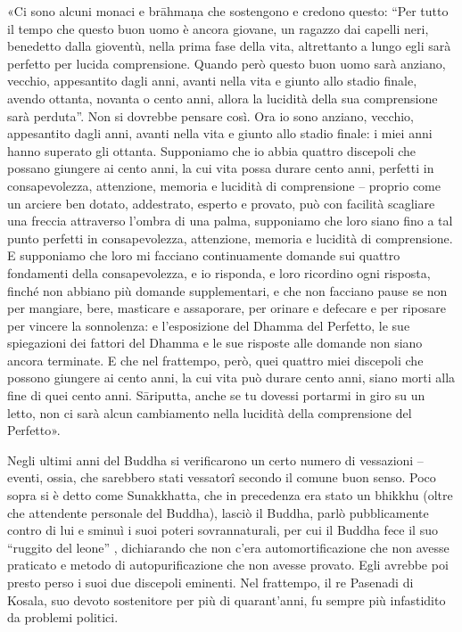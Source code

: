 «Ci sono alcuni monaci e brāhmaṇa che sostengono e credono questo: “Per tutto il
tempo che questo buon uomo è ancora giovane, un ragazzo dai capelli neri,
benedetto dalla gioventù, nella prima fase della vita, altrettanto a lungo egli
sarà perfetto per lucida comprensione. Quando però questo buon uomo sarà
anziano, vecchio, appesantito dagli anni, avanti nella vita e giunto allo stadio
finale, avendo ottanta, novanta o cento anni, allora la lucidità della sua
comprensione sarà perduta”. Non si dovrebbe pensare così. Ora io sono anziano,
vecchio, appesantito dagli anni, avanti nella vita e giunto allo stadio finale:
i miei anni hanno superato gli ottanta. Supponiamo che io abbia quattro
discepoli che possano giungere ai cento anni, la cui vita possa durare cento
anni, perfetti in consapevolezza, attenzione, memoria e lucidità di comprensione
– proprio come un arciere ben dotato, addestrato, esperto e provato, può con
facilità scagliare una freccia attraverso l’ombra di una palma, supponiamo che
loro siano fino a tal punto perfetti in consapevolezza, attenzione, memoria e
lucidità di comprensione. E supponiamo che loro mi facciano continuamente
domande sui quattro fondamenti della consapevolezza, e io risponda, e loro
ricordino ogni risposta, finché non abbiano più domande supplementari, e che non
facciano pause se non per mangiare, bere, masticare e assaporare, per orinare e
defecare e per riposare per vincere la sonnolenza: e l’esposizione del Dhamma
del Perfetto, le sue spiegazioni dei fattori del Dhamma e le sue risposte alle
domande non siano ancora terminate. E che nel frattempo, però, quei quattro miei
discepoli che possono giungere ai cento anni, la cui vita può durare cento anni,
siano morti alla fine di quei cento anni. Sāriputta, anche se tu dovessi
portarmi in giro su un letto, non ci sarà alcun cambiamento nella lucidità della
comprensione del Perfetto».


 Negli ultimi anni del Buddha si verificarono un
certo numero di vessazioni – eventi, ossia, che sarebbero stati vessatorî
secondo il comune buon senso. Poco sopra si è detto come Sunakkhatta, che in
precedenza era stato un bhikkhu (oltre che attendente personale del Buddha),
lasciò il Buddha, parlò pubblicamente contro di lui e sminuì i suoi poteri
sovrannaturali, per cui il Buddha fece il suo “ruggito del leone” , dichiarando
che non c’era automortificazione che non avesse praticato e metodo di
autopurificazione che non avesse provato. Egli avrebbe poi presto perso i suoi
due discepoli eminenti. Nel frattempo, il re Pasenadi di Kosala, suo devoto
sostenitore per più di quarant’anni, fu sempre più infastidito da problemi
politici.

